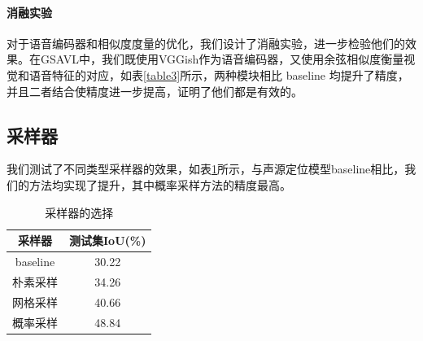 \documentclass[12pt]{article}
\begin{document}
\paragraph{消融实验}
对于语音编码器和相似度度量的优化，我们设计了消融实验，进一步检验他们的效果。在GSAVL中，我们既使用VGGish作为语音编码器，又使用余弦相似度衡量视觉和语音特征的对应，如表\ref{table3}所示，两种模块相比 baseline 均提升了精度，并且二者结合使精度进一步提高，证明了他们都是有效的。

\subsection{采样器}\label{samplerex}
我们测试了不同类型采样器的效果，如表\ref{figure:sampler}所示，与声源定位模型baseline相比，我们的方法均实现了提升，其中概率采样方法的精度最高。
\begin{table}[H]
    \centering
    \begin{tabular}{|c|c|}
    \hline
         采样器 &  测试集IoU(\%) \\ \hline
         baseline &  30.22 \\ \hline
        朴素采样 &  34.26 \\ \hline
        网格采样&40.66\\\hline
        概率采样&48.84\\\hline
    \end{tabular}
    \caption{采样器的选择}
    \label{figure:sampler}
\end{table}
\end{document}
